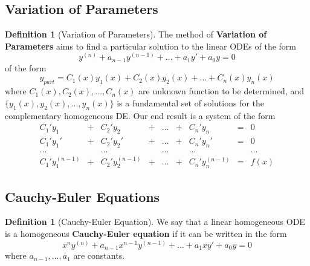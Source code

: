 \documentclass[12pt]{article}
\theoremstyle{definition}
\newtheorem{defn}[thm]{Definition}
\theoremstyle{remark}
\numberwithin{equation}{section}
\newcommand\B[1]{\textbf{ #1}}
\begin{document}
\vspace{1cm}

\subsection{Variation of Parameters}

\begin{defn}[Variation of Parameters]
        The method of \B{Variation of Parameters} aims to find a particular solution to the linear ODEs of the form \begin{equation}
                y^{(n)}+a_{n-1}y^{(n-1)}+\hdots+a_1y'+a_0y = 0
        \end{equation} 
        of the form \begin{equation}
                y_{part} = C_1(x)y_1(x) + C_2(x)y_2(x)+...+C_n(x)y_n(x)
        \end{equation}
        where $C_1(x), C_2(x), ..., C_n(x)$ are unknown function to be determined, and $\{y_1(x), y_2(x),...,y_n(x)\}$ is a fundamental set of solutions for the complementary homogeneous DE. Our end result is a system of the form \begin{equation}
                \begin{matrix}
                        C_1'y_1& +& C_2'y_2&+&\hdots&+&C_n'y_n& =& 0 \\
                        C_1'y_1'& +& C_2'y_2'&+&\hdots&+&C_n'y_n' &=& 0 \\
                        \hdots&&\hdots&&\hdots&&\hdots&&\hdots \\
                        C_1'y_1^{(n-1)}& + &C_2'y_2^{(n-1)}&+&\hdots&+&C_n'y_n^{(n-1)} &=& f(x)
                \end{matrix}
        \end{equation}
\end{defn}

\vspace{1cm}

\subsection{Cauchy-Euler Equations}


\begin{defn}[Cauchy-Euler Equation]
        We say that a linear homogeneous ODE is a homogeneous \B{Cauchy-Euler equation} if it can be written in the form \begin{equation}
                x^ny^{(n)}+a_{n-1}x^{n-1}y^{(n-1)}+...+a_1xy'+a_0y=0
        \end{equation}
        where $a_{n-1},...,a_1$ are constants.
\end{defn}
\end{document}
